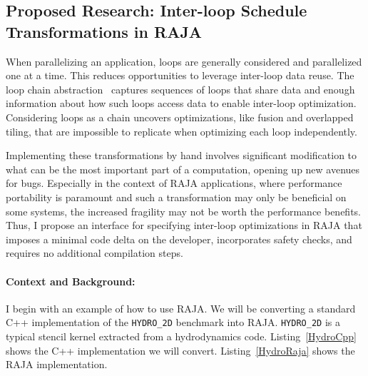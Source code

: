 \documentclass{article}
\begin{document}
\subsection{Proposed Research: Inter-loop Schedule Transformations in RAJA}
When parallelizing an application, loops are generally considered and
parallelized one at a time.
This reduces opportunities to leverage inter-loop data reuse.
The loop chain abstraction~\cite{krieger2013loop} captures sequences of loops that share 
data and enough information about how such loops access 
data to enable inter-loop optimization.
Considering loops as a chain uncovers optimizations, like fusion
and overlapped tiling, that are impossible to replicate when optimizing
each loop independently.

Implementing these transformations by hand involves significant modification to what can be the most important part of a computation, opening up new avenues for bugs. 
Especially in the context of RAJA applications, where performance portability is paramount and such a transformation may only be beneficial on some systems, the increased fragility may not be worth the performance benefits. 
Thus, I propose an interface for specifying inter-loop optimizations in RAJA that imposes a minimal code delta on the developer, incorporates safety checks, and requires no additional compilation steps. 

\paragraph{Context and Background:}

I begin with an example of how to use RAJA. We will be converting a standard C++ implementation of the \verb.HYDRO_2D. benchmark into RAJA. 
\verb.HYDRO_2D. is a typical stencil kernel extracted from a hydrodynamics code. 
Listing~\ref{HydroCpp} shows the C++ implementation we will convert.
Listing~\ref{HydroRaja} shows the RAJA implementation.
\end{document}
